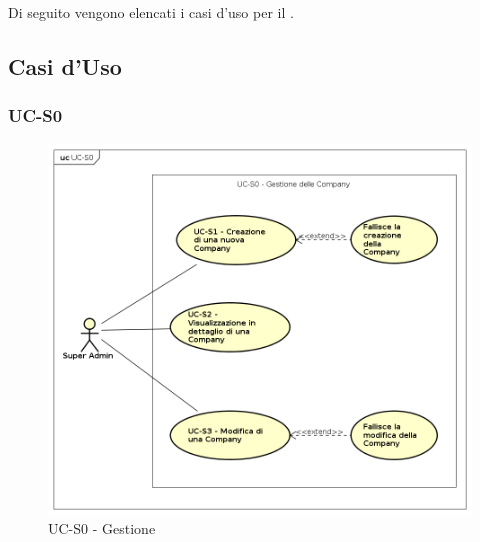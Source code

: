 \section{}

Di seguito vengono elencati i casi d'uso per il .


\subsection{Casi d'Uso}

\subsubsection{UC-S0}

    \begin{figure}[h]
      \begin{center}
        \includegraphics[width=12cm]{res/img/UCSuperadmin/UC-S0.png}
      \caption{UC-S0 - Gestione }
      \end{center} 
    \end{figure}    
    
